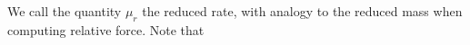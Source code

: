 We call the quantity \(\mu_r\) the reduced rate, with analogy to the reduced mass when computing relative force.  Note that